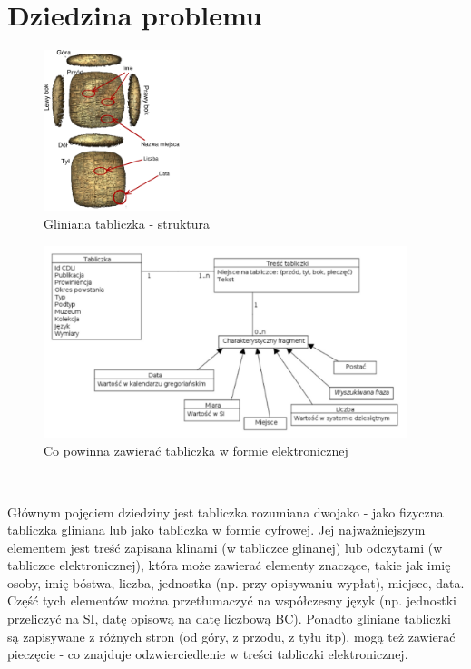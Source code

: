 \chapter{Dziedzina problemu}

\begin{figure}
 \centering
 \includegraphics[width=150px]{../diagramy/tabliczka.pdf}
 \caption{Gliniana tabliczka - struktura}
\end{figure}



\begin{figure}
 \centering
 \includegraphics[width=400px]{../diagramy/Model-dziedziny.pdf}
 \caption{Co powinna zawierać tabliczka w formie elektronicznej}
\end{figure}
~ 

Głównym pojęciem dziedziny jest tabliczka rozumiana dwojako - jako fizyczna tabliczka gliniana lub jako tabliczka w formie cyfrowej. 
Jej najważniejszym elementem jest treść zapisana klinami (w tabliczce glinanej) lub odczytami (w tabliczce elektronicznej), która 
może zawierać elementy znaczące, takie jak imię 
osoby, imię bóstwa, liczba, jednostka (np. przy opisywaniu wypłat), miejsce, data. Część tych elementów można przetłumaczyć na 
współczesny język (np. jednostki przeliczyć na SI, datę opisową na datę liczbową BC). 
Ponadto gliniane tabliczki są zapisywane z różnych stron 
(od góry, z przodu, z tyłu itp), mogą też zawierać pieczęcie - co znajduje odzwierciedlenie w treści tabliczki elektronicznej. 

